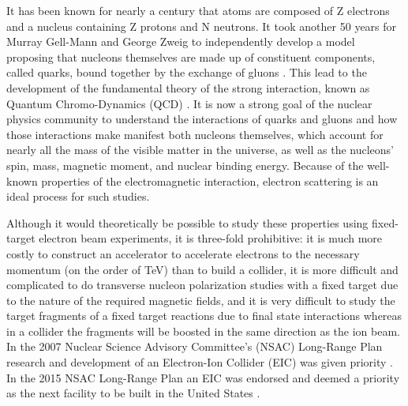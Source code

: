 \label{ch:eic}
It has been known for nearly a century that atoms are composed of Z electrons and a nucleus containing Z protons and N neutrons. It took another 50 years for Murray Gell-Mann and George Zweig to independently develop a model proposing that nucleons themselves are made up of constituent components, called quarks, bound together by the exchange of gluons \cite{SymmetryBreaking}. This lead to the development of the fundamental theory of the strong interaction, known as Quantum Chromo-Dynamics (QCD) \cite{QCDdiscovery}. It is now a strong goal of the nuclear physics community to understand the interactions of quarks and gluons and how those interactions make manifest both nucleons themselves, which account for nearly all the mass of the visible matter in the universe, as well as the nucleons' spin, mass, magnetic moment, and nuclear binding energy. Because of the well-known properties of the electromagnetic interaction, electron scattering is an ideal process for such studies. 

Although it would theoretically be possible to study these properties using fixed-target electron beam experiments, it is three-fold prohibitive: it is much more costly to construct an accelerator to accelerate electrons to the necessary momentum (on the order of TeV) than to build a collider, it is more difficult and complicated to do transverse nucleon polarization studies with a fixed target due to the nature of the required magnetic fields, and it is very difficult to study the target fragments of a fixed target reactions due to final state interactions whereas in a collider the fragments will be boosted in the same direction as the ion beam. In the 2007 Nuclear Science Advisory Committee's (NSAC) Long-Range Plan research and development of an Electron-Ion Collider (EIC) was given priority \cite{NSAC2007}. In the 2015 NSAC Long-Range Plan an EIC was endorsed and deemed a priority as the next facility to be built in the United States \cite{NSAC2015}.

